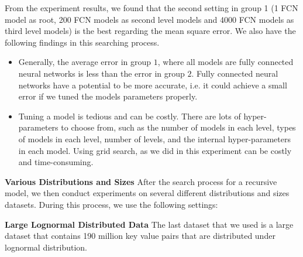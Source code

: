 
From the experiment results, we found that the second setting in group 1 (1 FCN model as root, 200 FCN models as second level models and 4000 FCN models as third level models) is the best regarding the mean square error. We also have the following findings in this searching process.

\begin{itemize}
	\item Generally, the average error in group $1$, where all models are fully connected neural networks is less than the error in group $2$. Fully connected neural networks have a potential to be more accurate, i.e. it could achieve a small error if we tuned the models parameters properly.
	\item Tuning a model is tedious and can be costly. There are lots of hyper-parameters to choose from, such as the number of models in each level, types of models in each level, number of levels, and the internal hyper-parameters in each model. Using grid search, as we did in this experiment can be costly and time-consuming.
\end{itemize}



\textbf{Various Distributions and Sizes} After the search process for a recursive model, we then conduct experiments on several different distributions and sizes datasets. During this process, we use the following settings:

\textbf{Large Lognormal Distributed Data} The last dataset that we used is a large dataset that contains 190 million key value pairs that are distributed under lognormal distribution.